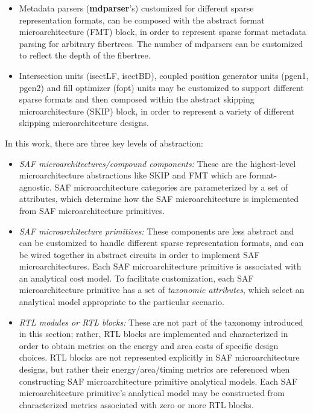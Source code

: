 \begin{itemize}
    \item Metadata parsers (\textbf{mdparser}'s) customized for different sparse representation formats, can be composed with the abstract format microarchitecture (FMT) block, in order to represent sparse format metadata parsing for arbitrary fibertrees. The number of mdparsers can be customized to reflect the depth of the fibertree.
    \item Intersection units (isectLF, isectBD), coupled position generator units (pgen1, pgen2) and fill optimizer (fopt) units may be customized to support different sparse formats and then composed within the abstract skipping microarchitecture (SKIP) block, in order to represent a variety of different skipping microarchitecture designs.
\end{itemize}

In this work, there are three key levels of abstraction:

\begin{itemize}
    \item \textit{SAF microarchitectures/compound components:} These are the highest-level microarchitecture abstractions like SKIP and FMT which are format-agnostic. SAF microarchitecture categories are parameterized by a set of attributes, which determine how the SAF microarchitecture is implemented from SAF microarchitecture primitives.
    \item \textit{SAF microarchitecture primitives:} These components are less abstract and can be customized to handle different sparse representation formats, and can be wired together in abstract circuits in order to implement SAF microarchitectures. Each SAF microarchitecture primitive is associated with an analytical cost model. To facilitate customization, each SAF microarchitecture primitive has a set of \textit{taxonomic attributes}, which select an analytical model appropriate to the particular scenario.
    \item \textit{RTL modules or RTL blocks:} These are not part of the taxonomy introduced in this section; rather, RTL blocks are implemented and characterized in order to obtain metrics on the energy and area costs of specific design choices. RTL blocks are not represented explicitly in SAF microarchitecture designs, but rather their energy/area/timing metrics are referenced when constructing SAF microarchitecture primitive analytical models. Each SAF microarchitecture primitive's analytical model may be constructed from characterized metrics associated with zero or more RTL blocks.
\end{itemize}
